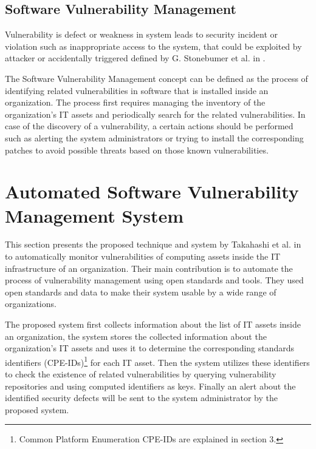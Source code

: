 \documentclass{llncs}
\begin{document}
       
\subsection{Software Vulnerability Management}

\par Vulnerability is defect or weakness in system leads to security incident or violation such as inappropriate access to the system, that could be exploited by attacker or accidentally triggered defined by G. Stonebumer et al. in \cite{vuln}.  

\par The Software Vulnerability Management concept can be defined as the process of identifying related vulnerabilities in software that is installed inside an organization. The process first requires managing the inventory of the organization's IT assets and  periodically search for the related vulnerabilities. In case of the discovery of a vulnerability, a certain actions should be performed such as alerting the system administrators or trying to install the corresponding patches to avoid possible threats based on those known vulnerabilities. 



   
\section{Automated Software Vulnerability Management System}

\par This section presents the proposed technique and system by Takahashi et al. in \cite{paper1} to automatically monitor vulnerabilities of computing assets inside the IT infrastructure of an organization. Their main contribution is to automate the process of vulnerability management using open standards and tools. They used open standards and data to make their system usable by a wide range of organizations.
\par
 The proposed system first collects information about the list of IT assets inside an organization, the system stores the collected information about the organization's IT assets and uses it to determine the corresponding standards identifiers (CPE-IDs)\footnote{ Common Platform Enumeration CPE-IDs are explained in section 3.} for each IT asset. Then the system utilizes these identifiers to check the existence of related vulnerabilities by querying vulnerability repositories and using computed identifiers as keys. Finally an alert about the identified security defects will be sent to the system administrator by the proposed system.
    
\end{document}

